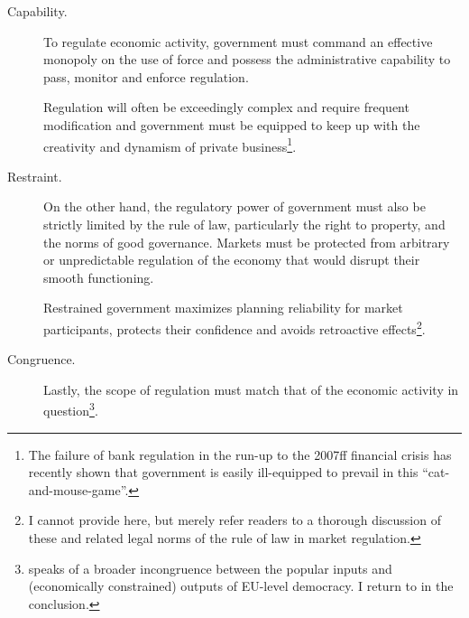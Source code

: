 \begin{description}
	\item[Capability.] \label{it:capability} To regulate economic activity, government must command an effective monopoly on the use of force and possess the administrative capability to pass, monitor and enforce regulation.

	Regulation will often be exceedingly complex and require frequent modification and government must be equipped to keep up with the creativity and dynamism of private business\footnote{
		The failure of bank regulation in the run-up to the 2007ff financial crisis has recently shown that government is easily ill-equipped to prevail in this ``cat-and-mouse-game''.}.

	\item[Restraint.] \label{it:restraint} On the other hand, the regulatory power of government must also be strictly limited by the rule of law, particularly the right to property, and the norms of good governance. Markets must be protected from arbitrary or unpredictable regulation of the economy that would disrupt their smooth functioning.

	Restrained government maximizes planning reliability for market participants, protects their confidence and avoids retroactive effects\footnote{
		I cannot provide here, but merely refer readers to a thorough discussion of these and related legal norms of the rule of law in market regulation.}. %

	\item[Congruence.] \label{it:congruence} Lastly, the scope of regulation must match that of the economic activity in question\footnote{
		\cite{Zurn-2000-aa} speaks of a broader incongruence between the popular inputs and (economically constrained) outputs of EU-level democracy. I return to in the conclusion.}.


\end{description}
